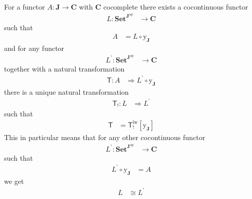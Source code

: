 \begin{cor}
\label{cor:yonedauniarr}
For a functor $A \colon \mathbf{J} \rightarrow \mathbf{C}$ with $\mathbf{C}$ cocomplete there exists a cocontinuous functor
\begin{align*}
  L
  \colon
  \mathbf{Set}^{\mathbf{J}^{\textrm{op}}}
  &\rightarrow
  \mathbf{C}
\end{align*}
such that
\begin{align*}
  A
  &=
  L
  \circ
  \mathrm{y}_{\mathbf{J}}
\end{align*}
and for any functor
\begin{align*}
  L^{\backprime}
  \colon
  \mathbf{Set}^{\mathbf{J}^{\textrm{op}}}
  &\rightarrow
  \mathbf{C}
\end{align*}
together with a natural transformation
\begin{align*}
  \mathsf{T}
  \colon
  A
  &\Rightarrow
  L^{\backprime}
  \circ
  \mathrm{y}_{\mathbf{J}}
\end{align*}
there is a unique natural transformation
\begin{align*}
  \mathsf{T}_{!}
  \colon
  L
  &\Rightarrow
  L^{\backprime}
\end{align*}
such that
\begin{align*}
  \mathsf{T}
  &=
  \mathsf{T}_{!}^{\textrm{lw}}
  \left[
    \mathrm{y}_{\mathbf{J}}
  \right]
\end{align*}
This in particular means that for any other cocontinuous functor
\begin{align*}
  L^{\backprime}
  \colon
  \mathbf{Set}^{\mathbf{J}^{\textrm{op}}}
  &\rightarrow
  \mathbf{C}
\end{align*}
such that
\begin{align*}
  L^{\backprime}
  \circ
  \mathrm{y}_{\mathbf{J}}
  &=
  A
\end{align*}
we get
\begin{align*}
  L
  &\cong
  L^{\backprime}
\end{align*}
\end{cor}
